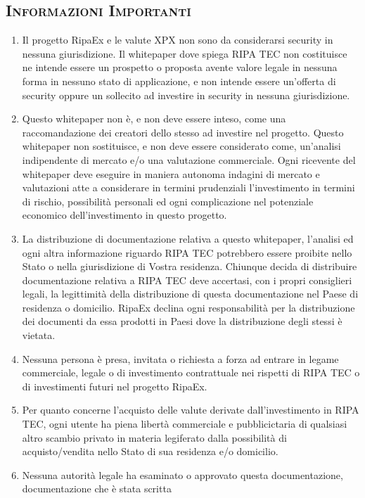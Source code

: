 \documentclass[11pt,fleqn]{book} %
\begin{document}
\begin{scriptsize}
{		\section{\textsc{Informazioni Importanti}}
		\begin{enumerate}
			\item Il progetto RipaEx e le valute XPX non sono da considerarsi security in nessuna giurisdizione.
			Il whitepaper dove spiega RIPA TEC non costituisce ne intende essere un prospetto o proposta 
			avente valore legale in nessuna forma in nessuno stato di applicazione, e non intende essere 
			un'offerta di security oppure un sollecito ad investire in security in nessuna giurisdizione.
			\item Questo whitepaper non è, e non deve essere inteso, come una raccomandazione dei creatori 
			dello stesso ad investire nel progetto. Questo whitepaper non sostituisce, e non deve essere 
			considerato come, un'analisi indipendente di mercato e/o una valutazione commerciale. 
			Ogni ricevente del whitepaper deve eseguire in maniera autonoma indagini di mercato e valutazioni atte
			a considerare in termini prudenziali l'investimento in termini di rischio, possibilità personali 
			ed ogni complicazione nel potenziale economico dell'investimento in questo progetto.
			\item La distribuzione di documentazione relativa a questo whitepaper, l'analisi ed ogni altra 
			informazione riguardo RIPA TEC potrebbero essere proibite nello Stato o nella giurisdizione di Vostra residenza.
			Chiunque decida di distribuire documentazione relativa a RIPA TEC deve accertasi, con i propri 
			consiglieri legali, la legittimità della distribuzione di questa documentazione nel Paese di residenza o domicilio. 
			RipaEx declina ogni responsabilità per la distribuzione dei documenti da essa prodotti in Paesi dove 
			la distribuzione degli stessi è vietata. 
			\item Nessuna persona è presa, invitata o richiesta a forza ad entrare in legame commerciale, legale o di
			investimento contrattuale nei rispetti di RIPA TEC o di investimenti futuri nel progetto RipaEx.
			\item Per quanto concerne l'acquisto delle valute derivate dall'investimento in RIPA TEC, ogni utente ha piena
			libertà commerciale e pubblicictaria di qualsiasi altro scambio privato in materia legiferato dalla possibilità
			di acquisto/vendita nello Stato di sua residenza e/o domicilio.
			\item Nessuna autorità legale ha esaminato o approvato questa documentazione, documentazione che è stata scritta

\end{enumerate}}
\end{scriptsize}
\end{document}
